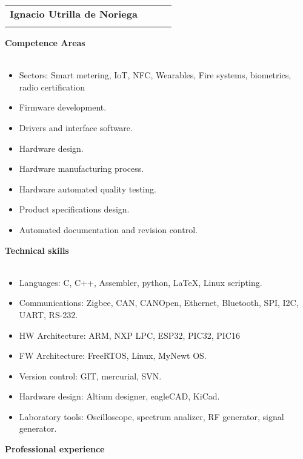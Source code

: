 \documentclass[9pt]{extarticle}
\begin{document}
\begin{table}
\centering{}
\begin{tabularx}{\textwidth}{lXlr}\\
							\textbf{\huge{Ignacio Utrilla de Noriega}}&&&\\\cline{1-4}
& & & \\

\end{tabularx}
\end{table}

\textbf{Competence Areas}\\
\linea\\
\begin{itemize}
\item{Sectors: Smart metering, IoT, NFC, Wearables, Fire systems, biometrics, radio certification}
\item{Firmware development.}
\item{Drivers and interface software.}
\item{Hardware design.}
\item{Hardware manufacturing process.}
\item{Hardware automated quality testing.}
\item{Product specifications design.}
\item{Automated documentation and revision control.}
\end{itemize}
\smallskip
\textbf{Technical skills}\\
\linea\\
\begin{itemize}
\item{Languages: C, C++, Assembler, python, \LaTeX, Linux scripting.}
\item{Communications: Zigbee, CAN, CANOpen, Ethernet, Bluetooth, SPI, I2C, UART, RS-232.}
\item{HW Architecture: ARM, NXP LPC, ESP32, PIC32, PIC16}
\item{FW Architecture: FreeRTOS, Linux, MyNewt OS.}
\item{Version control: GIT, mercurial, SVN.}
\item{Hardware design: Altium designer, eagleCAD, KiCad.}
\item{Laboratory tools: Oscilloscope, spectrum analizer, RF generator, signal generator.}
\end{itemize}
\smallskip
\textbf{Professional experience}\\
\linea\\
\end{document}
